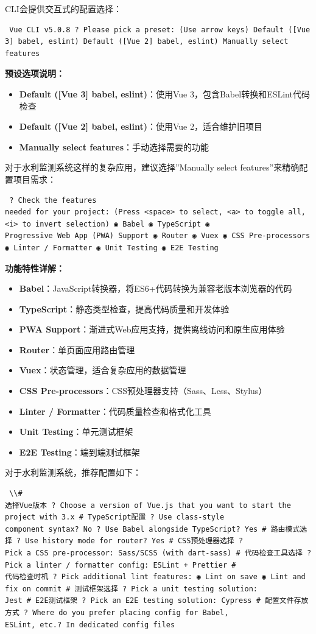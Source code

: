 CLI会提供交互式的配置选择： \begin{lstlisting} Vue CLI v5.0.8 ? Please pick a preset: (Use arrow keys) Default ([Vue
3] babel, eslint) Default ([Vue 2] babel, eslint) Manually select features \end{lstlisting} \textbf{预设选项说明：}
\begin{itemize} \tightlist \item \textbf{Default ([Vue 3] babel, eslint)}：使用Vue 3，包含Babel转换和ESLint代码检查 \item
\textbf{Default ([Vue 2] babel, eslint)}：使用Vue 2，适合维护旧项目 \item \textbf{Manually select features}：手动选择需要的功能 \end{itemize}
对于水利监测系统这样的复杂应用，建议选择''Manually select features''来精确配置项目需求： \begin{lstlisting} ? Check the features
needed for your project: (Press <space> to select, <a> to toggle all, <i> to invert selection) ◉ Babel ◉ TypeScript ◉
Progressive Web App (PWA) Support ◉ Router ◉ Vuex ◉ CSS Pre-processors ◉ Linter / Formatter ◉ Unit Testing ◉ E2E Testing
\end{lstlisting} \textbf{功能特性详解：} \begin{itemize} \tightlist \item \textbf{Babel}：JavaScript转换器，将ES6+代码转换为兼容老版本浏览器的代码
\item \textbf{TypeScript}：静态类型检查，提高代码质量和开发体验 \item \textbf{PWA Support}：渐进式Web应用支持，提供离线访问和原生应用体验 \item
\textbf{Router}：单页面应用路由管理 \item \textbf{Vuex}：状态管理，适合复杂应用的数据管理 \item \textbf{CSS
Pre-processors}：CSS预处理器支持（Sass、Less、Stylus） \item \textbf{Linter / Formatter}：代码质量检查和格式化工具 \item \textbf{Unit
Testing}：单元测试框架 \item \textbf{E2E Testing}：端到端测试框架 \end{itemize} 对于水利监测系统，推荐配置如下： \begin{lstlisting} \\#
选择Vue版本 ? Choose a version of Vue.js that you want to start the project with 3.x # TypeScript配置 ? Use class-style
component syntax? No ? Use Babel alongside TypeScript? Yes # 路由模式选择 ? Use history mode for router? Yes # CSS预处理器选择 ?
Pick a CSS pre-processor: Sass/SCSS (with dart-sass) # 代码检查工具选择 ? Pick a linter / formatter config: ESLint + Prettier #
代码检查时机 ? Pick additional lint features: ◉ Lint on save ◉ Lint and fix on commit # 测试框架选择 ? Pick a unit testing solution:
Jest # E2E测试框架 ? Pick an E2E testing solution: Cypress # 配置文件存放方式 ? Where do you prefer placing config for Babel,
ESLint, etc.? In dedicated config files \end{lstlisting}

